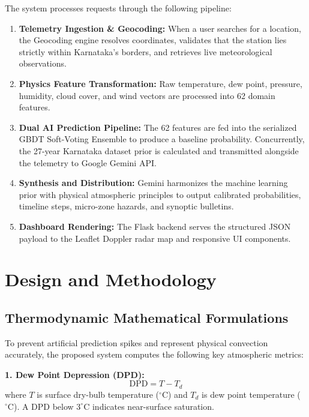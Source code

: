 \documentclass[12pt,a4paper]{report}
\begin{document}
The system processes requests through the following pipeline:
\begin{enumerate}[leftmargin=*]
    \item \textbf{Telemetry Ingestion \& Geocoding:} When a user searches for a location, the Geocoding engine resolves coordinates, validates that the station lies strictly within Karnataka's borders, and retrieves live meteorological observations.
    \item \textbf{Physics Feature Transformation:} Raw temperature, dew point, pressure, humidity, cloud cover, and wind vectors are processed into 62 domain features.
    \item \textbf{Dual AI Prediction Pipeline:} The 62 features are fed into the serialized GBDT Soft-Voting Ensemble to produce a baseline probability. Concurrently, the 27-year Karnataka dataset prior is calculated and transmitted alongside the telemetry to Google Gemini API.
    \item \textbf{Synthesis and Distribution:} Gemini harmonizes the machine learning prior with physical atmospheric principles to output calibrated probabilities, timeline steps, micro-zone hazards, and synoptic bulletins.
    \item \textbf{Dashboard Rendering:} The Flask backend serves the structured JSON payload to the Leaflet Doppler radar map and responsive UI components.
\end{enumerate}

\section{Design and Methodology}

\subsection{Thermodynamic Mathematical Formulations}
To prevent artificial prediction spikes and represent physical convection accurately, the proposed system computes the following key atmospheric metrics:

\vspace{0.2cm}
\noindent \textbf{1. Dew Point Depression (DPD):}
\begin{equation}
    \text{DPD} = T - T_d
\end{equation}
where $T$ is surface dry-bulb temperature ($^\circ\text{C}$) and $T_d$ is dew point temperature ($^\circ\text{C}$). A DPD below $3^\circ\text{C}$ indicates near-surface saturation.
\end{document}
